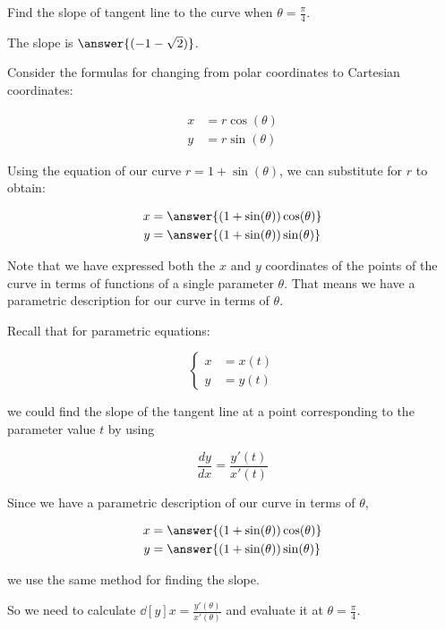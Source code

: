 \documentclass{ximera}
\begin{document}
\begin{exercise}
\begin{hint}
\end{hint}

\begin{exercise}

Find the slope of tangent line to the curve when $\theta=\frac{\pi}{4}$. 

The slope is $\answer{ ( -1-\sqrt{2} )  }$.

\begin{hint}

Consider the formulas for changing from polar coordinates to Cartesian coordinates:

\begin{align*}
x&=r\cos(\theta) \\
y&=r\sin(\theta)
\end{align*}

Using the equation of our curve $r=1+\sin(\theta)$, we can substitute for $r$ to obtain:

\begin{align*}
x&=\answer{(1+\sin(\theta))\cos(\theta)} \\
y&=\answer{(1+\sin(\theta))\sin(\theta) }
\end{align*}

Note that we have expressed both the $x$ and $y$ coordinates of the points of the curve in terms of functions of a single parameter $\theta$. That means we have a parametric description for our curve in terms of $\theta$. 

Recall that for parametric equations: 

\[ \begin{cases}
x&=x(t) \\
y&=y(t)
\end{cases} \]

we could find the slope of the tangent line at a point corresponding to the parameter value $t$ by using 

\[\frac{dy}{dx}=\frac{ y'(t)}{x'(t)}\]


Since we have a parametric description of our curve in terms of $\theta$, 

\begin{align*}
x&=\answer{(1+\sin(\theta))\cos(\theta)} \\
y&=\answer{(1+\sin(\theta))\sin(\theta) }
\end{align*}

we use the same method for finding the slope. 

So we need to calculate $\dd[y]{x}=\frac{ y'(\theta)}{x'(\theta)}$ and evaluate it at $\theta=\frac{\pi}{4}$. 


\end{hint}
\end{exercise}
\end{exercise}
\end{document}
